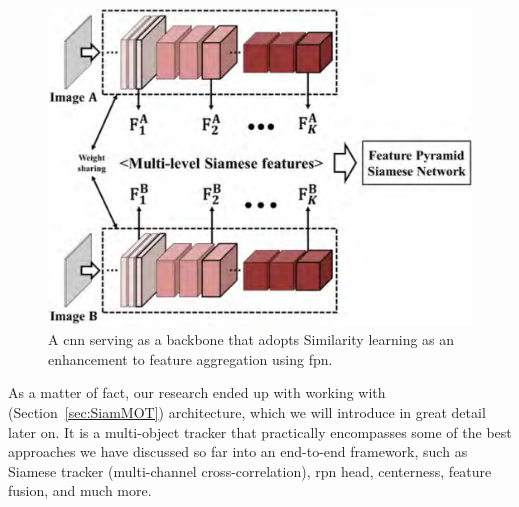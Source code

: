 \begin{figure}[!t]
    \centerline{\includegraphics[width=0.7\linewidth]{figures/theoretical_foundations/feature_pyramid_siamese_network.png}}
    \caption[\Gls{fpsn} architecture]{A \gls{cnn} serving as a backbone that adopts Similarity learning as an enhancement to feature aggregation using \gls{fpn}. }
    \label{fig:FeaturePyramidSiameseNetwork}
\end{figure}

As a matter of fact, our research ended up with working with \siammot{}~\cite{shuai2021siammot} (Section~\ref{sec:SiamMOT}) architecture, which we will introduce in great detail later on. It is a multi-object tracker that practically encompasses some of the best approaches we have discussed so far into an end-to-end framework, such as Siamese tracker (multi-channel cross-correlation), \gls{rpn} head, centerness, feature fusion, and much more.